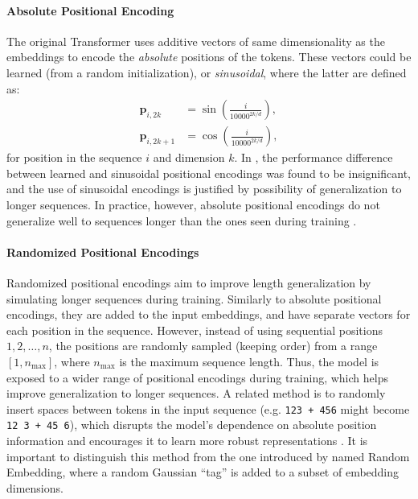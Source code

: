 \paragraph{Absolute Positional Encoding}\label{subsec:absolute_pos_enc}
The original Transformer \parencite{vaswani_attention_2017} uses additive vectors of same dimensionality as the embeddings to encode the \emph{absolute} positions of the tokens. These vectors could be learned (from a random initialization), or \emph{sinusoidal}, where the latter are defined as:
\begin{align*}
    \mathbf{p}_{i,2k}   & = \sin\left( \frac{i}{10000^{2k/d}} \right), \\
    \mathbf{p}_{i,2k+1} & = \cos\left( \frac{i}{10000^{2k/d}} \right),
\end{align*}
for position in the sequence $i$ and dimension $k$. In \cite{vaswani_attention_2017}, the performance difference between learned and sinusoidal positional encodings was found to be insignificant, and the use of sinusoidal encodings is justified by possibility of generalization to longer sequences. In practice, however, absolute positional encodings do not generalize well to sequences longer than the ones seen during training \parencite{press_train_2021}.

\paragraph{Randomized Positional Encodings}\label{subsec:random_pos_enc}
Randomized positional encodings \cite{ruoss_randomized_2023} aim to improve length generalization by simulating longer sequences during training. Similarly to absolute positional encodings, they are added to the input embeddings, and have separate vectors for each position in the sequence. However, instead of using sequential positions $1, 2, \dots, n$, the positions are randomly sampled (keeping order) from a range $[1, n_{\text{max}}]$, where $n_{\text{max}}$ is the maximum sequence length. Thus, the model is exposed to a wider range of positional encodings during training, which helps improve generalization to longer sequences. A related method is to randomly insert spaces between tokens in the input sequence (e.g. \texttt{123 + 456} might become \texttt{12 3  + 45 6}), which disrupts the model's dependence on absolute position information and encourages it to learn more robust representations \parencite{shen_positional_2023}. It is important to distinguish this method from the one introduced by \cite{shen_positional_2023} named Random Embedding, where a random Gaussian ``tag'' is added to a subset of embedding dimensions.


